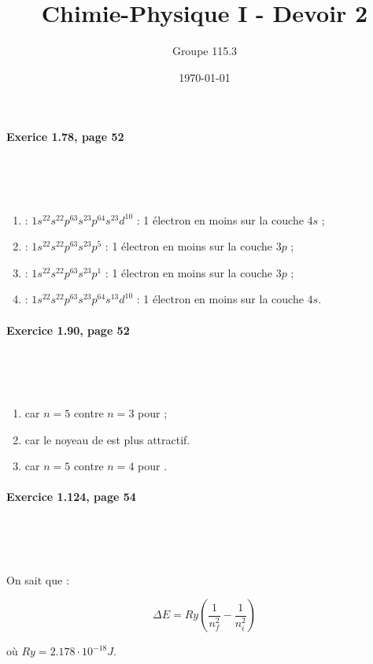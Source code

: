 \documentclass{article}
\title{Chimie-Physique I - Devoir 2}
\author{Groupe 115.3}
\date{\today}
\newcommand\exercice[1]{%
\paragraph{#1}%
~\par
~\par}
\begin{document}
\maketitle

\exercice{Exerice 1.78, page 52}

\begin{enumerate}
  \item {} : $1s^22s^22p^63s^23p^64s^23d^{10}$ : 1 électron en moins sur la couche $4s$ ;
  \item {} : $1s^22s^22p^63s^23p^5$ : 1 électron en moins sur la couche $3p$ ;
  \item {} : $1s^22s^22p^63s^23p^1$ : 1 électron en moins sur la couche $3p$ ;
  \item {} : $1s^22s^22p^63s^23p^64s^13d^{10}$ : 1 électron en moins sur la couche $4s$.
\end{enumerate}

\exercice{Exercice 1.90, page 52}

\begin{enumerate}
	\item {} car $n = 5$ contre $n = 3$ pour  ;
	\item {} car le noyeau de  est plus attractif.
	\item {} car $n = 5$ contre $n = 4$ pour .
\end{enumerate}

\exercice{Exercice 1.124, page 54}

On sait que :

$$\Delta E = Ry(\frac{1}{n^2_f} - \frac{1}{n^2_i})$$

où $Ry = 2.178 \cdot 10^{-18} J$.
\end{document}
